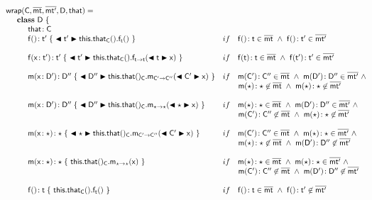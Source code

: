 \documentclass[acmlarge, anonymous, authordraft]{acmart}
\begin{document}
\vspace{4mm}
\[\begin{array}{@{}ll@{}l@{}r@{~}c@{~}r}
    \wrap\C\bmt\bmtp\D\that = \\
\SP \class ~\D ~ \{\\
\SPP \Fdef\that\C \\
\SPP \Mdefz\f{\tp}{~\bscast\tp{\Get{\Get\this\that\C}\f\t}~}
&    if\,\,\,\,\,\, \Mtype\f{}\t\in\bmt ~\wedge~ \Mtype\f{}\tp \in \bmtp \\
\\
\SPP \Mdef\f\x\tp\tp {~\bscast\tp{\Set{\Get\this\that\C}\f\t{\bscast\t\x}}~}
&    if\,\,\,\,\,\, \Mtype\f\t\t \in \bmt ~\wedge~ \Mtype\f\tp\tp \in \bmtp \\
\\
\SPP \Mdef\m\x\Dp\Dpp {~\bscast\Dpp{{\KCall{\this.\that()_{\C}} \m {\bscast{\Cp}\x}\Cp\Cpp }}~}
&     if\,\,\,\,\,\, \Mtype\m\Cp\Cpp\in\bmt ~\wedge~ \Mtype\m\Dp\Dpp\in\bmtp ~\wedge~ \\
&     \multicolumn{5}{l}{\qquad \Mtype\m\any\any\not\in\bmt ~\wedge~ \Mtype\m\any\any\not\in\bmtp} \\
\\
\SPP \Mdef\m\x\Dp\Dpp{~\bscast\Dpp{\KCall{\this.\that()_{\C}} \m {\bscast\any\x}\any\any }~}
&    if\,\,\,\,\,\, \Mtype\m\any\any\in\bmt ~\wedge~ \Mtype\m\Dp\Dpp\in\bmtp ~\wedge~  \\
&     \multicolumn{5}{l}{\qquad \Mtype\m\Cp\Cpp\not\in\bmt ~\wedge~  \Mtype\m\any\any\not\in\bmtp } \\
\\
\SPP \Mdef\m\x\any\any{~\bscast\any{\KCall{\this.\that()_{\C}}\m{\bscast{\Cp}\x}\Cp\Cpp}~}
&    if\,\,\,\,\,\, \Mtype\m\Cp\Cpp\in\bmt ~\wedge~ \Mtype\m\any\any\in\bmtp ~\wedge~   \\
&     \multicolumn{5}{l}{\qquad \Mtype\m\any\any\not\in\bmt ~\wedge~  \Mtype\m\Dp\Dpp\not\in\bmtp } \\
\\
\SPP \Mdef\m\x\any\any{~{\KCall{\this.\that()_{\C}}\m{\x}\any\any}~}
&    if\,\,\,\,\,\, \Mtype\m\any\any\in\bmt ~\wedge~ \Mtype\m\any\any\in\bmtp ~\wedge~ \\
&     \multicolumn{5}{l}{\qquad \Mtype\m\Cp\Cpp\not\in\bmt ~\wedge~ \Mtype\m\Dp\Dpp\not\in\bmtp} \\
\\
\SPP \Mdefz\f\t { ~\Get{\Get\this\that\C}\f\t~}
&    if\,\,\,\,\,\, \Mtype\f{}\t \in \bmt ~\wedge~ \Mtype\f{}\tp \not\in \bmtp \\

\end{array}\]
\end{document}
